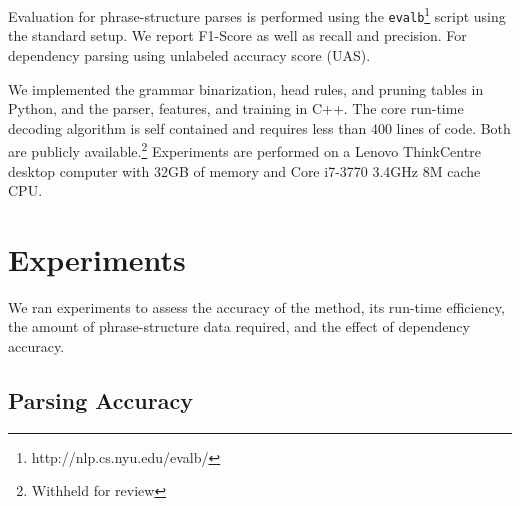 \documentclass[11pt,letterpaper]{article}
\begin{document}
Evaluation for phrase-structure parses is performed using the
\texttt{evalb}\footnote{http://nlp.cs.nyu.edu/evalb/} script using the
standard setup. We report F1-Score as well as recall and
precision. For dependency parsing using unlabeled accuracy score
(UAS).

We implemented the grammar binarization, head rules, and pruning
tables in Python, and the parser, features, and training in C++. The
core run-time decoding algorithm is self contained and requires less
than 400 lines of code. Both are publicly available.\footnote{Withheld
  for review} Experiments are performed on a Lenovo ThinkCentre desktop computer
with 32GB of memory and  Core i7-3770 3.4GHz 8M cache CPU.

\section{Experiments}

We ran experiments to assess the accuracy of the method, its run-time efficiency, the amount of phrase-structure data required, and the effect of dependency accuracy.

\subsection{Parsing Accuracy}
\end{document}
